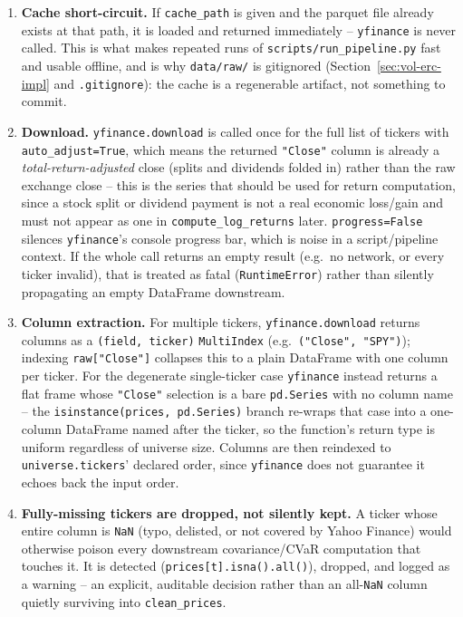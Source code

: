 \documentclass[11pt]{article}
\begin{document}
\begin{enumerate}
    \item \textbf{Cache short-circuit.} If \texttt{cache\_path} is given
    and the parquet file already exists at that path, it is loaded and
    returned immediately -- \texttt{yfinance} is never called. This is
    what makes repeated runs of \texttt{scripts/run\_pipeline.py} fast
    and usable offline, and is why \texttt{data/raw/} is gitignored
    (Section~\ref{sec:vol-erc-impl} and \texttt{.gitignore}): the cache
    is a regenerable artifact, not something to commit.

    \item \textbf{Download.} \texttt{yfinance.download} is called once
    for the full list of tickers with \texttt{auto\_adjust=True}, which
    means the returned \texttt{"Close"} column is already a
    \emph{total-return-adjusted} close (splits and dividends folded in)
    rather than the raw exchange close -- this is the series that should
    be used for return computation, since a stock split or dividend
    payment is not a real economic loss/gain and must not appear as one
    in \texttt{compute\_log\_returns} later. \texttt{progress=False}
    silences \texttt{yfinance}'s console progress bar, which is noise in
    a script/pipeline context. If the whole call returns an empty
    result (e.g.\ no network, or every ticker invalid), that is treated
    as fatal (\texttt{RuntimeError}) rather than silently propagating an
    empty DataFrame downstream.

    \item \textbf{Column extraction.} For multiple tickers,
    \texttt{yfinance.download} returns columns as a
    \texttt{(field, ticker)} \texttt{MultiIndex} (e.g.\
    \texttt{("Close", "SPY")}); indexing \texttt{raw["Close"]} collapses
    this to a plain DataFrame with one column per ticker. For the
    degenerate single-ticker case \texttt{yfinance} instead returns a
    flat frame whose \texttt{"Close"} selection is a bare
    \texttt{pd.Series} with no column name -- the
    \texttt{isinstance(prices, pd.Series)} branch re-wraps that case into
    a one-column DataFrame named after the ticker, so the function's
    return type is uniform regardless of universe size. Columns are then
    reindexed to \texttt{universe.tickers}' declared order, since
    \texttt{yfinance} does not guarantee it echoes back the input order.

    \item \textbf{Fully-missing tickers are dropped, not silently kept.}
    A ticker whose entire column is \texttt{NaN} (typo, delisted, or not
    covered by Yahoo Finance) would otherwise poison every downstream
    covariance/CVaR computation that touches it. It is detected
    (\texttt{prices[t].isna().all()}), dropped, and logged as a warning
    -- an explicit, auditable decision rather than an all-\texttt{NaN}
    column quietly surviving into \texttt{clean\_prices}.


\end{enumerate}
\end{document}
